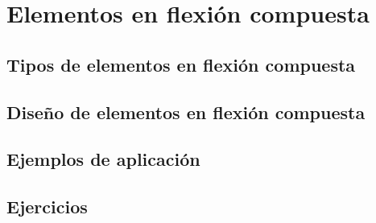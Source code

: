 %
%

\chapter{Elementos en flexión compuesta}
\section{Tipos de elementos en flexión compuesta}
\section{Diseño de elementos en flexión compuesta}
\section{Ejemplos de aplicación}
\section{Ejercicios}